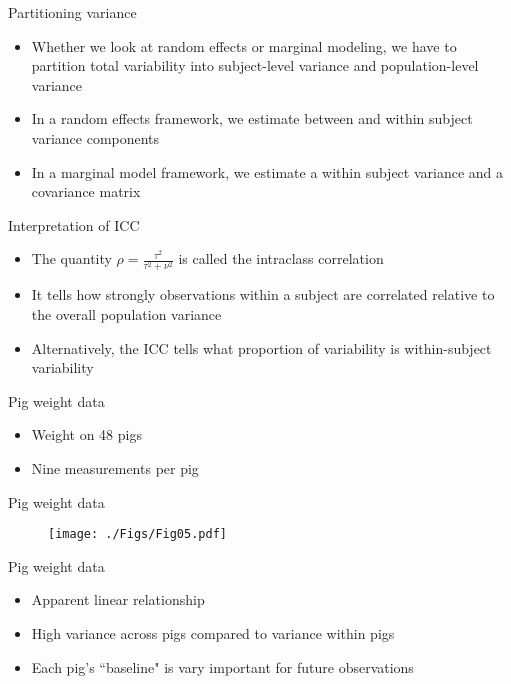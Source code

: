 \documentclass{beamer}
\newcommand{\myitem}{\item[\tiny$\blacksquare$]}
\newcommand{\bi}{\begin{itemize}}
\newcommand{\ei}{\end{itemize}}
\newcommand{\1}{{\mathbf{1}}}
\begin{document}

\begin{frame}{Partitioning variance}

\bi
	\myitem Whether we look at random effects or marginal modeling, we have to partition total variability into subject-level variance and population-level variance
	\myitem In a random effects framework, we estimate between and within subject variance components
	\myitem In a marginal model framework, we estimate a within subject variance and a covariance matrix
\ei

\end{frame}



\begin{frame}[t]{Interpretation of ICC}

\bi
	\myitem The quantity $\rho = \frac{\tau^2}{\tau^2 + \nu^2}$ is called the intraclass correlation
	\myitem It tells how strongly observations within a subject are correlated relative to the overall population variance
	\myitem Alternatively, the ICC tells what proportion of variability is within-subject variability
\ei

\end{frame}



\begin{frame}{Pig weight data}

\bi
	\myitem Weight on 48 pigs
	\myitem Nine measurements per pig
\ei

\end{frame}



\begin{frame}{Pig weight data}

\begin{figure}[h]
    \texttt{[image: ./Figs/Fig05.pdf]}  
\end{figure}

\end{frame}



\begin{frame}{Pig weight data}

\bi
	\myitem Apparent linear relationship
	\myitem High variance across pigs compared to variance within pigs
	\myitem Each pig's ``baseline" is vary important for future observations
\ei

\end{frame}
\end{document}
